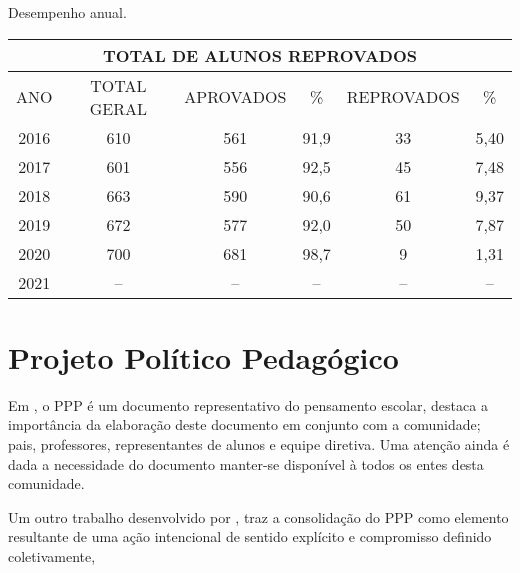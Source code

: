 \begin{quadro}[ht!]
    \centering
    \caption{Desempenho anual.}
    \label{qua:totalReprovacao}
    \begin{tabular}{|cccccc|}
        \hline
        \multicolumn{6}{|c|}{\textbf{TOTAL DE ALUNOS REPROVADOS}}                                                                                     \\ \hline
        \multicolumn{1}{|c|}{ANO} & \multicolumn{1}{c|}{TOTAL GERAL} & \multicolumn{1}{c|}{APROVADOS} & \multicolumn{1}{c|}{\%} & \multicolumn{1}{c|}{REPROVADOS} & \% \\ \hline
        \multicolumn{1}{|c|}{2016} & \multicolumn{1}{c|}{610} & \multicolumn{1}{c|}{561} & \multicolumn{1}{c|}{91,9} & \multicolumn{1}{c|}{33} & 5,40 \\ \hline
        \multicolumn{1}{|c|}{2017} & \multicolumn{1}{c|}{601} & \multicolumn{1}{c|}{556} & \multicolumn{1}{c|}{92,5} & \multicolumn{1}{c|}{45} & 7,48 \\ \hline
        \multicolumn{1}{|c|}{2018} & \multicolumn{1}{c|}{663} & \multicolumn{1}{c|}{590} & \multicolumn{1}{c|}{90,6} & \multicolumn{1}{c|}{61} & 9,37 \\ \hline
        \multicolumn{1}{|c|}{2019} & \multicolumn{1}{c|}{672} & \multicolumn{1}{c|}{577} & \multicolumn{1}{c|}{92,0} & \multicolumn{1}{c|}{50} & 7,87 \\ \hline
        \multicolumn{1}{|c|}{2020} & \multicolumn{1}{c|}{700} & \multicolumn{1}{c|}{681} & \multicolumn{1}{c|}{98,7} & \multicolumn{1}{c|}{9}  & 1,31 \\ \hline
        \multicolumn{1}{|c|}{2021} & \multicolumn{1}{c|}{--}  & \multicolumn{1}{c|}{--}  & \multicolumn{1}{c|}{--}   & \multicolumn{1}{c|}{--} & --   \\ \hline
    \end{tabular}
\end{quadro}
\newpage
\section{Projeto Político Pedagógico}
Em \cite{CARVALHO:2012a}, o \ac{PPP} é um documento representativo do pensamento escolar, destaca a importância da elaboração deste documento em conjunto com a comunidade; pais, professores, representantes de alunos e equipe diretiva. Uma atenção ainda é dada a necessidade do documento manter-se disponível à todos os entes desta comunidade. 

Um outro trabalho desenvolvido por \cite{VEIGA:1995}, traz a consolidação do PPP como elemento resultante de uma ação intencional de sentido explícito e compromisso definido coletivamente,

